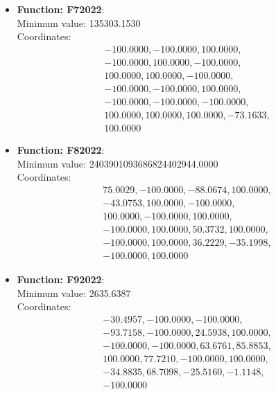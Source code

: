 \documentclass{article}
\begin{document}
\begin{itemize}
  \item \textbf{Function: F72022}: \\
    Minimum value: 135303.1530 \\
    Coordinates:
    \[
      \begin{aligned}
        & -100.0000, -100.0000, 100.0000, \\
        & -100.0000, 100.0000, -100.0000, \\
        & 100.0000, 100.0000, -100.0000, \\
        & -100.0000, -100.0000, 100.0000, \\
        & -100.0000, -100.0000, -100.0000, \\
        & 100.0000, 100.0000, 100.0000, -73.1633, \\
        & 100.0000
      \end{aligned}
    \]

  \item \textbf{Function: F82022}: \\
    Minimum value: 2403901093686824402944.0000 \\
    Coordinates:
    \[
      \begin{aligned}
        & 75.0029, -100.0000, -88.0674, 100.0000, \\
        & -43.0753, 100.0000, -100.0000, \\
        & 100.0000, -100.0000, 100.0000, \\
        & -100.0000, 100.0000, 50.3732, 100.0000, \\
        & -100.0000, 100.0000, 36.2229, -35.1998, \\
        & -100.0000, 100.0000
      \end{aligned}
    \]

  \item \textbf{Function: F92022}: \\
    Minimum value: 2635.6387 \\
    Coordinates:
    \[
      \begin{aligned}
        & -30.4957, -100.0000, -100.0000, \\
        & -93.7158, -100.0000, 24.5938, 100.0000, \\
        & -100.0000, -100.0000, 63.6761, 85.8853, \\
        & 100.0000, 77.7210, -100.0000, 100.0000, \\
        & -34.8835, 68.7098, -25.5160, -1.1148, \\
        & -100.0000
      \end{aligned}
    \]


\end{itemize}
\end{document}
